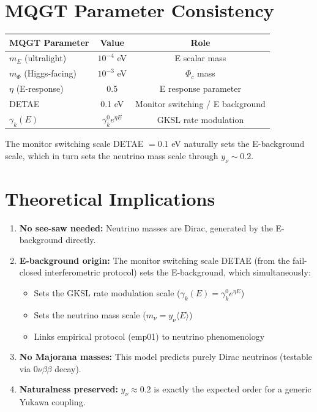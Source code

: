 \documentclass[11pt]{article}
\begin{document}
\section{MQGT Parameter Consistency}
\begin{table}[ht]
\centering
\begin{tabular}{lcc}
\toprule
MQGT Parameter & Value & Role \\
\midrule
$m_E$ (ultralight) & $10^{-4}$ eV & E scalar mass \\
$m_\Phi$ (Higgs-facing) & $10^{-3}$ eV & $\Phi_c$ mass \\
$\eta$ (E-response) & 0.5 & E response parameter \\
DETAE & 0.1 eV & Monitor switching / E background \\
$\gamma_k(E)$ & $\gamma_k^0 e^{\eta E}$ & GKSL rate modulation \\
\bottomrule
\end{tabular}
\end{table}
The monitor switching scale DETAE $= 0.1$ eV naturally sets the E-background scale, which in turn sets the neutrino mass scale through $y_\nu \sim 0.2$.

\section{Theoretical Implications}
\begin{enumerate}
\item \textbf{No see-saw needed:} Neutrino masses are Dirac, generated by the E-background directly.
\item \textbf{E-background origin:} The monitor switching scale DETAE (from the fail-closed interferometric protocol) sets the E-background, which simultaneously:
  \begin{itemize}
  \item Sets the GKSL rate modulation scale ($\gamma_k(E) = \gamma_k^0 e^{\eta E}$)
  \item Sets the neutrino mass scale ($m_\nu = y_\nu \langle E \rangle$)
  \item Links empirical protocol (emp01) to neutrino phenomenology
  \end{itemize}
\item \textbf{No Majorana masses:} This model predicts purely Dirac neutrinos (testable via $0\nu\beta\beta$ decay).
\item \textbf{Naturalness preserved:} $y_\nu \approx 0.2$ is exactly the expected order for a generic Yukawa coupling.
\end{enumerate}
\end{document}
